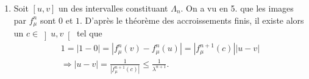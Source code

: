 \begin{enumerate}
\begin{enumerate}
\item Soit $\left[ u, v \right]$ un des intervalles constituant $\Lambda_n$. On a vu en 5. que les images par $f_\mu^n$ sont $0$ et $1$. D'après le théorème des accroissements finis, il existe alors un $c\in \left] u, v \right[$ tel que
\begin{multline*}
 1 = |1-0| = \left\vert f_\mu^n(v) - f_\mu^n(u)\right\vert = \left\vert f_\mu^{n+1}(c)\right\vert |u-v|\\
\Rightarrow |u-v| = \frac{1}{\left\vert f_\mu^{n+1}(c)\right\vert} \leq \frac{1}{\lambda^{n+1}} .
\end{multline*}
\end{enumerate}

\end{enumerate}
